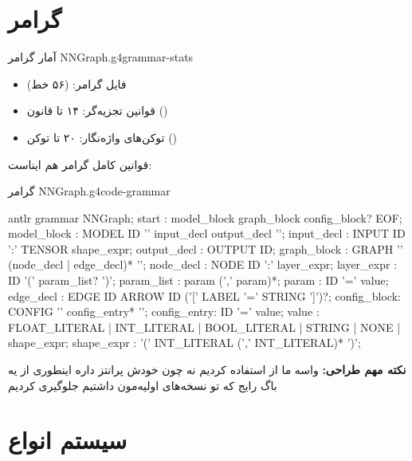 \documentclass{nngraph-fa}
\begin{document}
\section{گرامر}

\begin{dfnbox}{آمار گرامر NNGraph.g4}{grammar-stats}
\begin{itemize}[noitemsep]
    \item فایل گرامر:  (۵۶ خط)
    \item قوانین تجزیه‌گر: ۱۴ تا قانون ()
    \item توکن‌های واژه‌نگار: ۲۰ تا توکن ()
\end{itemize}
\end{dfnbox}

قوانین کامل گرامر هم ایناست:

\begin{codebox}{گرامر NNGraph.g4}{code-grammar}
\begin{amzcode}{antlr}
grammar NNGraph;
start     : model_block graph_block config_block? EOF;
model_block : MODEL ID '{' input_decl output_decl '}';
input_decl  : INPUT ID ':' TENSOR shape_expr;
output_decl : OUTPUT ID;
graph_block : GRAPH '{' (node_decl | edge_decl)* '}';
node_decl   : NODE ID ':' layer_expr;
layer_expr  : ID '(' param_list? ')';
param_list  : param (',' param)*;
param       : ID '=' value;
edge_decl   : EDGE ID ARROW ID ('[' LABEL '=' STRING ']')?;
config_block: CONFIG '{' config_entry* '}';
config_entry: ID '=' value;
value       : FLOAT_LITERAL | INT_LITERAL | BOOL_LITERAL
            | STRING | NONE | shape_expr;
shape_expr  : '(' INT_LITERAL (',' INT_LITERAL)* ')';
\end{amzcode}
\end{codebox}

\begin{notebox}
\textbf{نکته مهم طراحی:} واسه  ما از  استفاده کردیم نه  چون  خودش پرانتز داره
اینطوری از یه باگ رایج که تو نسخه‌های اولیه‌مون داشتیم جلوگیری کردیم
\end{notebox}

\section{سیستم انواع}
\end{document}
